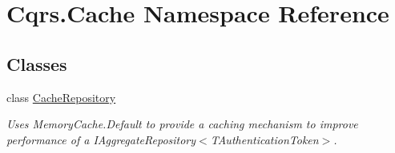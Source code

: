 \hypertarget{namespaceCqrs_1_1Cache}{}\section{Cqrs.\+Cache Namespace Reference}
\label{namespaceCqrs_1_1Cache}
\subsection*{Classes}
\begin{DoxyCompactItemize}
\item 
class \hyperlink{classCqrs_1_1Cache_1_1CacheRepository}{Cache\+Repository}
\begin{DoxyCompactList}\small\item\em Uses Memory\+Cache.\+Default to provide a caching mechanism to improve performance of a I\+Aggregate\+Repository$<$\+T\+Authentication\+Token$>$. \end{DoxyCompactList}\end{DoxyCompactItemize}
